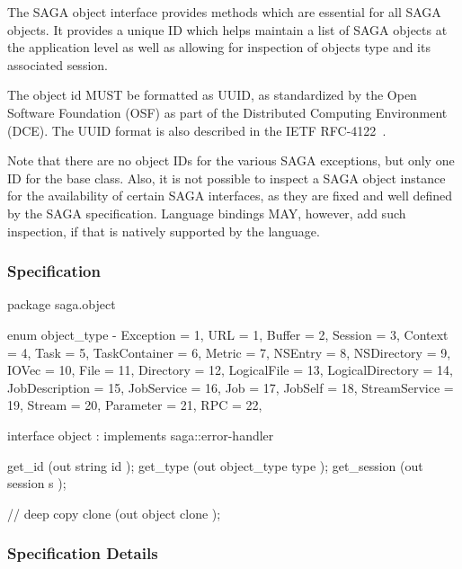  
  The SAGA object interface provides methods which are essential
  for all SAGA objects.  It provides a unique ID which helps
  maintain a list of SAGA objects at the application level as
  well as allowing for inspection of objects type and its
  associated session.
        
  The object id MUST be formatted as UUID, as standardized by
  the Open Software Foundation (OSF) as part of the Distributed
  Computing Environment (DCE).  The UUID format is also
  described in the IETF RFC-4122~\cite{rfc-4122}.
 
  Note that there are no object IDs for the various
  SAGA exceptions, but only one ID for the 
  base class. Also, it is not possible to inspect a SAGA object
  instance for the availability of certain SAGA interfaces, as
  they are fixed and well defined by the SAGA specification.
  Language bindings MAY, however, add such inspection, if that
  is natively supported by the language.
 
 \subsubsection{Specification}
 
 \begin{myspec}
  package saga.object
  {
    enum object_type
    {
-     Exception        =   1,
      URL              =   1,
      Buffer           =   2,
      Session          =   3,
      Context          =   4,
      Task             =   5,
      TaskContainer    =   6,
      Metric           =   7,
      NSEntry          =   8,
      NSDirectory      =   9,
      IOVec            =  10,
      File             =  11,
      Directory        =  12,
      LogicalFile      =  13,
      LogicalDirectory =  14,
      JobDescription   =  15,
      JobService       =  16,
      Job              =  17,
      JobSelf          =  18,
      StreamService    =  19,
      Stream           =  20,
      Parameter        =  21,
      RPC              =  22,
    }
 
 
    interface object : implements saga::error-handler
    {
      get_id       (out string      id     );
      get_type     (out object_type type   );
      get_session  (out session     s      );
 
      // deep copy
      clone        (out object      clone  );
    }
  }
 \end{myspec}
 
 
 \subsubsection{Specification Details}
 
